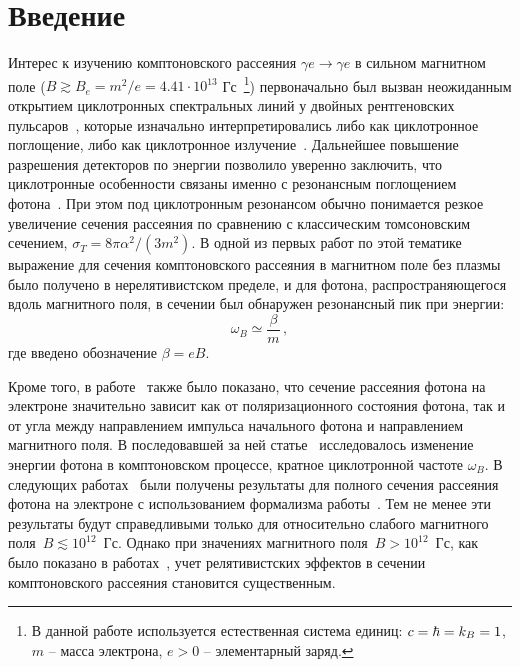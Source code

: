 \documentclass[cp1251%
               ]{jetp} %
\begin{document}
\maketitle

\section{Введение}

Интерес к изучению комптоновского рассеяния $\gamma e \to \gamma e$ в 
сильном магнитном поле ($B\gtrsim B_e = m^2 / e= 4.41\cdot 10^{13}$ Гс~\footnote{В данной работе используется естественная система единиц: $c = \hbar = k_{\rm{B}} = 1$, $m$ -- масса электрона, $e > 0$ -- элементарный заряд.}) первоначально был вызван неожиданным открытием циклотронных 
спектральных линий у двойных рентгеновских 
пульсаров~\cite{Truemper1978,Makishima1990,Grove1995}, которые изначально 
интерпретировались либо как циклотронное поглощение, либо как циклотронное 
излучение~\cite{Truemper1978}. Дальнейшее повышение разрешения детекторов по 
энергии позволило уверенно заключить, что циклотронные особенности связаны 
именно с резонансным поглощением фотона~\cite{Mihara:1990}.
При этом под циклотронным резонансом обычно понимается 
резкое увеличение сечения рассеяния по сравнению с классическим томсоновским 
сечением, $\sigma_T = 8 \pi \alpha^2 /(3 m^2)$. В одной из первых 
работ по этой тематике~\cite{Canuto:1971} выражение для сечения комптоновского рассеяния в магнитном поле без плазмы было получено в нерелятивистском пределе, и для фотона, распространяющегося вдоль магнитного поля, в сечении был обнаружен резонансный пик при энергии: 
\begin{equation}\label{eq:w_B}
	\omega_B\simeq \frac{\beta}{m}\, ,
\end{equation}
\noindent где введено обозначение $\beta = eB$.

Кроме того, в работе~\cite{Canuto:1971} также было показано, что сечение рассеяния фотона 
на электроне
значительно зависит как от поляризационного состояния фотона, так и от угла 
между направлением импульса начального фотона и направлением магнитного поля. В 
последовавшей за ней 
статье~\cite{Gnedin1973} 
исследовалось изменение энергии фотона в комптоновском процессе, кратное 
циклотронной частоте $\omega_B$. 
В следующих работах~\cite{Borner1979,Ventura:1979} 
были получены результаты для полного сечения рассеяния фотона на электроне с использованием формализма работы~\cite{Canuto:1971}. Тем не менее эти результаты будут справедливыми только для относительно слабого магнитного поля~$B\lesssim10^{12}$~Гс. Однако при значениях магнитного поля~$B>10^{12}$~Гс, как было показано в работах~\cite{Herold:1979,Melrose:1983III},   учет релятивистских эффектов в сечении комптоновского рассеяния становится 
существенным.
\end{document}
